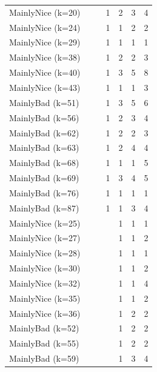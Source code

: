 \documentclass[journal,10pt,twoside]{IEEEtran}
\begin{document}
\begin{table}[ht]
\begin{minipage}{.4\textwidth}
\begin{tabular}{l|cccccc}
        MainlyNice (k=20)    &     &     &    1 &    2 &    3 &    4 \\
        MainlyNice (k=24)    &     &     &    1 &    1 &    2 &    2 \\
        MainlyNice (k=29)    &     &     &    1 &    1 &    1 &    1 \\
        MainlyNice (k=38)    &     &     &    1 &    2 &    2 &    3 \\
        MainlyNice (k=40)    &     &     &    1 &    3 &    5 &    8 \\
        MainlyNice (k=43)    &     &     &    1 &    1 &    1 &    3 \\
        MainlyBad (k=51)     &     &     &    1 &    3 &    5 &    6 \\
        MainlyBad (k=56)     &     &     &    1 &    2 &    3 &    4 \\
        MainlyBad (k=62)     &     &     &    1 &    2 &    2 &    3 \\
        MainlyBad (k=63)     &     &     &    1 &    2 &    4 &    4 \\
        MainlyBad (k=68)     &     &     &    1 &    1 &    1 &    5 \\
        MainlyBad (k=69)     &     &     &    1 &    3 &    4 &    5 \\
        MainlyBad (k=76)     &     &     &    1 &    1 &    1 &    1 \\
        MainlyBad (k=87)     &     &     &    1 &    1 &    3 &    4 \\
        MainlyNice (k=25)    &     &     &      &    1 &    1 &    1 \\
        MainlyNice (k=27)    &     &     &      &    1 &    1 &    2 \\
        MainlyNice (k=28)    &     &     &      &    1 &    1 &    1 \\
        MainlyNice (k=30)    &     &     &      &    1 &    1 &    2 \\
        MainlyNice (k=32)    &     &     &      &    1 &    1 &    4 \\
        MainlyNice (k=35)    &     &     &      &    1 &    1 &    2 \\
        MainlyNice (k=36)    &     &     &      &    1 &    2 &    2 \\
        MainlyBad (k=52)     &     &     &      &    1 &    2 &    2 \\
        MainlyBad (k=55)     &     &     &      &    1 &    2 &    2 \\
        MainlyBad (k=59)     &     &     &      &    1 &    3 &    4 \\

\end{tabular}
\end{minipage}
\end{table}
\end{document}
